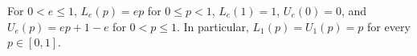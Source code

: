 For \(0<e\le1\), \(L_e(p)=e p\) for \(0\le p<1\), \(L_e(1)=1\), \(U_e(0)=0\), and \(U_e(p)=e p+1-e\) for \(0<p\le1\). In particular, \(L_1(p)=U_1(p)=p\) for every \(p\in[0,1]\).